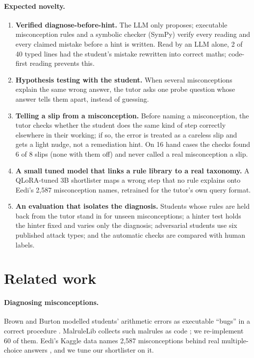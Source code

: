 \documentclass[11pt,a4paper]{article}
\begin{document}
\paragraph{Expected novelty.}
\begin{enumerate}[label=\arabic*., leftmargin=1.6em]
  \item \textbf{Verified diagnose-before-hint.} The LLM only proposes; executable misconception rules and a symbolic checker (SymPy) verify every reading and every claimed mistake before a hint is written. Read by an LLM alone, 2 of 40 typed lines had the student's mistake rewritten into correct maths; code-first reading prevents this.
  \item \textbf{Hypothesis testing with the student.} When several misconceptions explain the same wrong answer, the tutor asks one probe question whose answer tells them apart, instead of guessing.
  \item \textbf{Telling a slip from a misconception.} Before naming a misconception, the tutor checks whether the student does the same kind of step correctly elsewhere in their working; if so, the error is treated as a careless slip and gets a light nudge, not a remediation hint. On 16 hand cases the checks found 6 of 8 slips (none with them off) and never called a real misconception a slip.
  \item \textbf{A small tuned model that links a rule library to a real taxonomy.} A QLoRA-tuned 3B shortlister maps a wrong step that no rule explains onto Eedi's 2,587 misconception names, retrained for the tutor's own query format.
  \item \textbf{An evaluation that isolates the diagnosis.} Students whose rules are held back from the tutor stand in for unseen misconceptions; a hinter test holds the hinter fixed and varies only the diagnosis; adversarial students use six published attack types; and the automatic checks are compared with human labels.
\end{enumerate}

\section{Related work}\label{sec:related}

\paragraph{Diagnosing misconceptions.} Brown and Burton modelled students' arithmetic errors as executable ``bugs'' in a correct procedure \cite{brownburton}. MalruleLib collects such malrules as code \cite{malrulelib}; we re-implement 60 of them. Eedi's Kaggle data names 2,587 misconceptions behind real multiple-choice answers \cite{eedi}, and we tune our shortlister on it.
\end{document}
